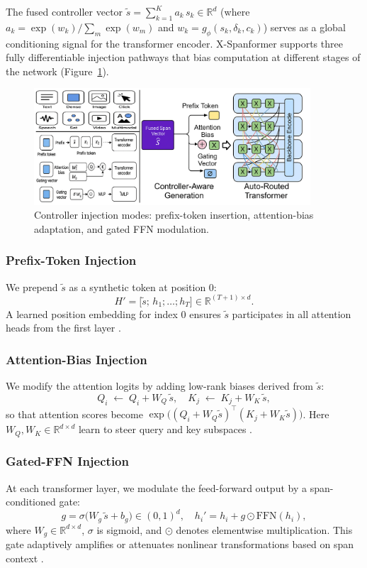 The fused controller vector 
\(\displaystyle \tilde{s} = \sum_{k=1}^K a_k\,s_k\in\mathbb{R}^d\) 
(where \(a_k=\exp(w_k)/\sum_{m}\exp(w_m)\) and \(w_k=g_\phi(s_k,\delta_k,c_k)\)) serves as a global conditioning signal for the transformer encoder.  X-Spanformer supports three fully differentiable injection pathways that bias computation at different stages of the network (Figure~\ref{fig:controller_injection_modes}).

\begin{figure}[H]
	\centering
	\includegraphics[width=0.92\textwidth]{figures/figure_5.png}
	\caption{Controller injection modes: prefix-token insertion, attention-bias adaptation, and gated FFN modulation.}
	\label{fig:controller_injection_modes}
\end{figure}

\subsubsection{Prefix-Token Injection}
We prepend \(\tilde{s}\) as a synthetic token at position 0:
\[
H' = \bigl[\tilde{s};\,h_1;\dots;h_T\bigr]\in\mathbb{R}^{(T+1)\times d}.
\]
A learned position embedding for index 0 ensures \(\tilde{s}\) participates in all attention heads from the first layer \cite{li2021prefix}. 

\subsubsection{Attention-Bias Injection}
We modify the attention logits by adding low-rank biases derived from \(\tilde{s}\):
\[
Q_i \;\leftarrow\; Q_i + W_Q\,\tilde{s},
\quad
K_j \;\leftarrow\; K_j + W_K\,\tilde{s},
\]
so that attention scores become 
\(\exp\bigl((Q_i + W_Q\tilde{s})^\top(K_j + W_K\tilde{s})\bigr)\).  
Here \(W_Q,W_K\in\mathbb{R}^{d\times d}\) learn to steer query and key subspaces \cite{hu2021lora}.  

\subsubsection{Gated-FFN Injection}
At each transformer layer, we modulate the feed-forward output by a span-conditioned gate:
\[
g = \sigma\bigl(W_g\,\tilde{s} + b_g\bigr)\in(0,1)^d,
\quad
h_i' = h_i + g \odot \mathrm{FFN}(h_i),
\]
where \(W_g\in\mathbb{R}^{d\times d}\), \(\sigma\) is sigmoid, and \(\odot\) denotes elementwise multiplication.  This gate adaptively amplifies or attenuates nonlinear transformations based on span context \cite{shazeer2017outrageously}.

